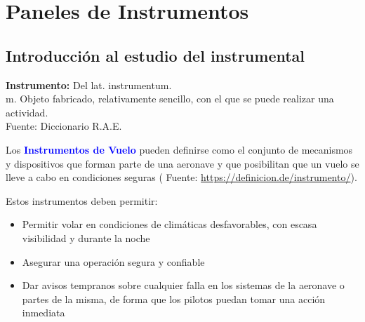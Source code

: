 


\chapter{Paneles de Instrumentos}
\label{chap:U01.paneles.instrumentos}


\section{Introducci\'on al estudio del instrumental}
\label{sec:01.01.introduccion.estudio.instrumental}

\begin{tcolorbox}{\bf Instrumento:} 
  Del lat. instrumentum.\\
  m. Objeto fabricado, relativamente sencillo, con el que se puede realizar una actividad.\\
  {\tiny Fuente: Diccionario R.A.E.}
\end{tcolorbox}

Los \textcolor{blue}{\bf Instrumentos de Vuelo} pueden definirse como
	el conjunto de mecanismos y dispositivos que forman parte de una aeronave y 
	que posibilitan que un vuelo se lleve a cabo en condiciones seguras 
( Fuente: \url{https://definicion.de/instrumento/}).

Estos instrumentos deben permitir: 

    \begin{itemize}
    \item Permitir volar en condiciones de clim\'aticas desfavorables, 
	con escasa visibilidad y durante la noche
    \item Asegurar una operaci\'on segura y confiable
    \item Dar avisos tempranos sobre cualquier falla en los sistemas
      de la aeronave o partes de la misma, de forma que los pilotos
      puedan tomar una acci\'on inmediata

    \end{itemize}
    

